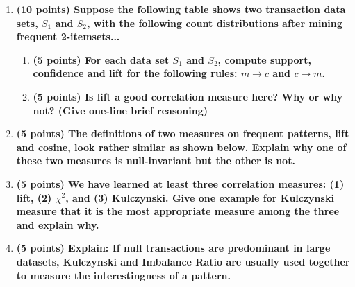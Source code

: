 \documentclass[12pt]{article}
\begin{document}
\begin{enumerate}[label=(\alph*)]
    \item \textbf{(10 points) Suppose the following table shows two transaction data sets, $S_1$ and $S_2$, with the following count distributions after mining frequent 2-itemsets...}
    \begin{enumerate}[label=\roman*.]
        \item \textbf{(5 points) For each data set $S_1$ and $S_2$, compute support, confidence and lift for the following rules: $m \rightarrow c$ and $c \rightarrow m$.}
        \\
        
        
        \vspace{1em}
        \item \textbf{(5 points) Is lift a good correlation measure here? Why or why not? (Give one-line brief reasoning)}
        \\
        
        
    \end{enumerate}
    
    \vspace{2em}
    
    \item \textbf{(5 points) The definitions of two measures on frequent patterns, lift and cosine, look rather similar as shown below. Explain why one of these two measures is null-invariant but the other is not.}
    \\
    
    
    \vspace{2em}

    \item \textbf{(5 points) We have learned at least three correlation measures: (1) lift, (2) $\chi^2$, and (3) Kulczynski. Give one example for Kulczynski measure that it is the most appropriate measure among the three and explain why.}
    \\
    
    
    \vspace{2em}

    \item \textbf{(5 points) Explain: If null transactions are predominant in large datasets, Kulczynski and Imbalance Ratio are usually used together to measure the interestingness of a pattern.}
    \\
    
    
\end{enumerate}
\end{document}
